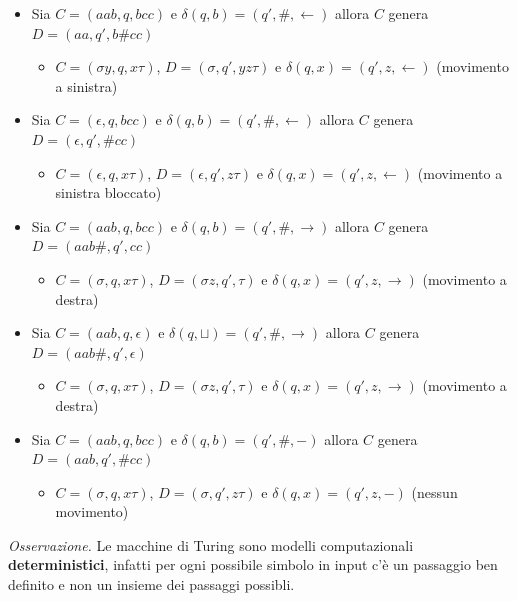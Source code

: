 \begin{itemize}
    \item Sia $C = (aab, q, bcc)$ e $\delta(q, b) = (q', \#, \leftarrow)$ allora $C$ genera $D = (aa, q', b\#cc)$
    \begin{itemize}
        \item $C = (\sigma y, q, x\tau)$, $D = (\sigma, q', yz\tau)$ e $\delta(q, x) = (q', z, \leftarrow)$ (movimento a sinistra)
    \end{itemize}
    
    \vspace{0.3cm} %
    
    \item Sia $C = (\epsilon, q, bcc)$ e $\delta(q, b) = (q', \#, \leftarrow)$ allora $C$ genera $D = (\epsilon, q', \#cc)$
    \begin{itemize}
        \item $C = (\epsilon, q, x\tau)$, $D = (\epsilon, q', z\tau)$ e $\delta(q, x) = (q', z, \leftarrow)$ (movimento a sinistra bloccato)
    \end{itemize}
    
    \vspace{0.3cm}
    
    \item Sia $C = (aab, q, bcc)$ e $\delta(q, b) = (q', \#, \rightarrow)$ allora $C$ genera $D = (aab\#, q', cc)$
    \begin{itemize}
        \item $C = (\sigma, q, x\tau)$, $D = (\sigma z, q', \tau)$ e $\delta(q, x) = (q', z, \rightarrow)$ (movimento a destra)
    \end{itemize}
    
    \vspace{0.3cm}
    
    \item Sia $C = (aab, q, \epsilon)$ e $\delta(q, \sqcup) = (q', \#, \rightarrow)$ allora $C$ genera $D = (aab\#, q', \epsilon)$
    \begin{itemize}
        \item $C = (\sigma, q, x\tau)$, $D = (\sigma z, q', \tau)$ e $\delta(q, x) = (q', z, \rightarrow)$ (movimento a destra)
    \end{itemize}
    
    \vspace{0.3cm}
    
    \item Sia $C = (aab, q, bcc)$ e $\delta(q, b) = (q', \#, -)$ allora $C$ genera $D = (aab, q', \#cc)$
    \begin{itemize}
        \item $C = (\sigma, q, x\tau)$, $D = (\sigma, q', z\tau)$ e $\delta(q, x) = (q', z, -)$ (nessun movimento)
    \end{itemize}
\end{itemize}
\noindent \textit{Osservazione.} Le macchine di Turing sono modelli computazionali \textbf{deterministici}, infatti per ogni possibile simbolo in input c'è un passaggio ben definito e non 
un insieme dei passaggi possibli.



